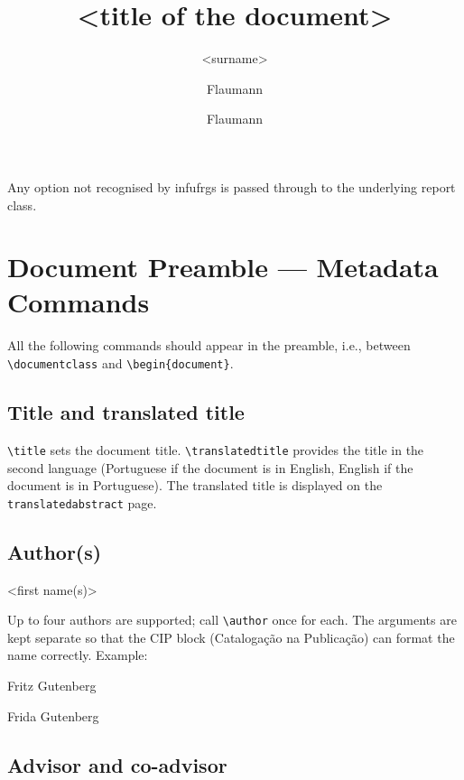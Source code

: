 \documentclass[11pt,a4paper]{article}
\newcommand{\cls}[1]{\textsf{#1}}
\newcommand{\cmd}[1]{\texttt{\textbackslash #1}}
\newcommand{\env}[1]{\texttt{#1}}
\begin{document}
Any option not recognised by \cls{infufrgs} is passed through to the
underlying \cls{report} class.

\section{Document Preamble — Metadata Commands}
\label{sec:preamble}

All the following commands should appear in the preamble, i.e., between
\cmd{documentclass} and \cmd{begin\{document\}}.

\subsection{Title and translated title}

\begin{latex}
\title{<title of the document>}
\end{latex}

\cmd{title} sets the document title.  \cmd{translatedtitle} provides
the title in the second language (Portuguese if the document is in
English, English if the document is in Portuguese).  The translated
title is displayed on the \env{translatedabstract} page.

\subsection{Author(s)}

\begin{latex}
\author{<surname>}{<first name(s)>}
\end{latex}

Up to four authors are supported; call \cmd{author} once for each.
The arguments are kept separate so that the CIP block (Catalogação na
Publicação) can format the name correctly.  Example:

\begin{latex}
\author{Flaumann}{Fritz Gutenberg}
\author{Flaumann}{Frida Gutenberg}
\end{latex}

\subsection{Advisor and co-advisor}

\begin{latex}
\end{latex}
\end{document}
